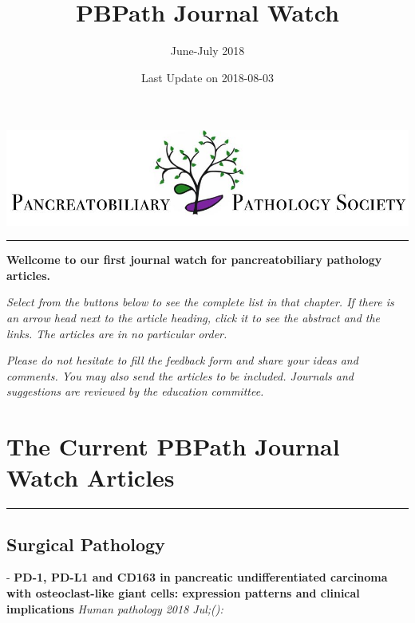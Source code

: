 \documentclass[]{article}
\title{PBPath Journal Watch}
\subtitle{June-July 2018}
\author{}
\date{Last Update on 2018-08-03}
\begin{document}
\maketitle

{
\setcounter{tocdepth}{2}
\tableofcontents
}
\href{http://pbpath.org/}{\includegraphics{figures/PBP_header_logo.jpg}}

\begin{center}\rule{0.5\linewidth}{\linethickness}\end{center}

\textbf{Wellcome to our first journal watch for pancreatobiliary
pathology articles.}

\emph{Select from the buttons below to see the complete list in that
chapter. If there is an arrow head next to the article heading, click it
to see the abstract and the links. The articles are in no particular
order.}

\emph{Please do not hesitate to fill the feedback form and share your
ideas and comments. You may also send the articles to be included.
Journals and suggestions are reviewed by the education committee.}

\hypertarget{the-current-pbpath-journal-watch-articles}{%
\section{The Current PBPath Journal Watch
Articles}\label{the-current-pbpath-journal-watch-articles}}

\begin{center}\rule{0.5\linewidth}{\linethickness}\end{center}

\hypertarget{surgical-pathology}{%
\subsection{Surgical Pathology}\label{surgical-pathology}}

 - \textbf{PD-1, PD-L1 and CD163 in pancreatic undifferentiated
carcinoma with osteoclast-like giant cells: expression patterns and
clinical implications} \emph{Human pathology 2018 Jul;():}
\end{document}

